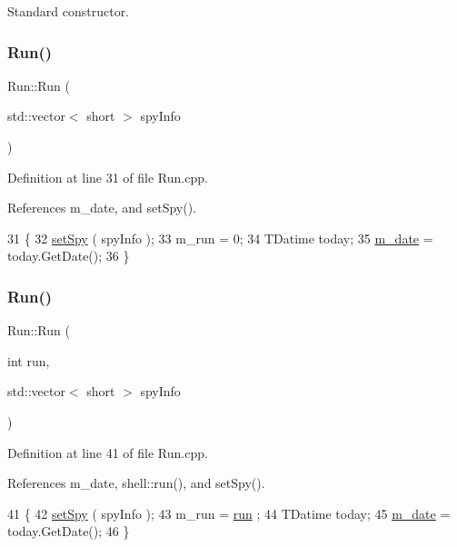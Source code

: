 Standard constructor. 

\mbox{\label{classRun_a45e6035b7001cde5d949b407faf0d8ca}} 
\subsubsection{\texorpdfstring{Run()}{Run()}\hspace{0.1cm}{\footnotesize\ttfamily [2/3]}}
{\footnotesize\ttfamily Run\+::\+Run (\begin{DoxyParamCaption}\item[{std\+::vector$<$ short $>$}]{spy\+Info }\end{DoxyParamCaption})}



Definition at line 31 of file Run.\+cpp.



References m\+\_\+date, and set\+Spy().


\begin{DoxyCode}
31                                         \{
32   \hyperlink{classRun_a391d15d3d908d3d011214dba1a075277}{setSpy} ( spyInfo );
33   m\_run    = 0;
34   TDatime today;
35   \hyperlink{classRun_a841000f96566fdbe5772f16ef3963006}{m\_date}   = today.GetDate();
36 \}
\end{DoxyCode}
\mbox{\label{classRun_aa9d670242947e1dc0e31ea68a7938611}} 
\subsubsection{\texorpdfstring{Run()}{Run()}\hspace{0.1cm}{\footnotesize\ttfamily [3/3]}}
{\footnotesize\ttfamily Run\+::\+Run (\begin{DoxyParamCaption}\item[{int}]{run,  }\item[{std\+::vector$<$ short $>$}]{spy\+Info }\end{DoxyParamCaption})}



Definition at line 41 of file Run.\+cpp.



References m\+\_\+date, shell\+::run(), and set\+Spy().


\begin{DoxyCode}
41                                                  \{
42   \hyperlink{classRun_a391d15d3d908d3d011214dba1a075277}{setSpy} ( spyInfo );
43   m\_run    = \hyperlink{namespaceshell_ac89ea08a5e75ecb222fe9e707b3ee102}{run} ;
44   TDatime today;
45   \hyperlink{classRun_a841000f96566fdbe5772f16ef3963006}{m\_date}   = today.GetDate();
46 \}
\end{DoxyCode}
\mbox{\label{classRun_a7fa0ac1770a5067113aaa1928be3d742}} 
